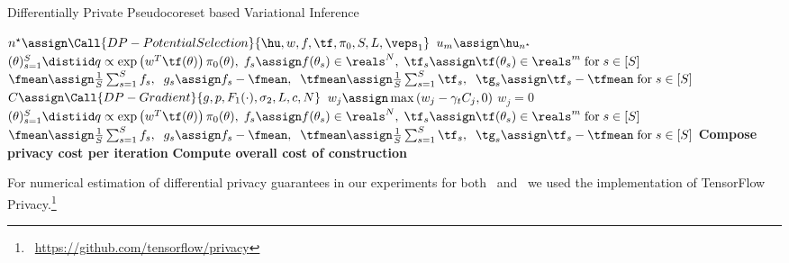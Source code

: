 \begin{algorithm*}[]
	\caption{Differentially Private Pseudocoreset based Variational Inference}
	\label{alg:dp-psvi}
	\begin{algorithmic}[1]
		\State $ n^\star \assign \Call{DP-PotentialSelection}{\hu, w, f, \tf, \pi_0, S, L, \veps_1}$
		\State $  u_m\assign \hu_{n^\star} $
		\State $ (\theta)_{s=1}^{S}  \distiid  q \propto  \exp\left(w^T\tf(\theta)\right)\pi_0(\theta),\; f_s \assign f(\theta_s)  \in \reals^{N}, \; \tf_s \assign \tf(\theta_s)  \in \reals^{m}\; \text{for} \; s\in [S] $ 
		\State $ {\fmean \assign \frac{1}{S} \sum_{s=1}^{S} f_s,\;\; g_s \assign f_s - \fmean, \;\; \tfmean \assign \frac{1}{S} \sum_{s=1}^{S} \tf_s,\;\; \tg_s \assign \tf_s - \tfmean \; \text{for} \;  s\in [S]} $
		\State $ C \assign \Call{DP-Gradient}{g, p, F_1(\cdot), \sigma_2, L, c, N} $  
{$w_j \assign \max\left(w_j - \gamma_t C_j, 0 \right)$}%
{$w_j=0$}  %
        \EndFor{}
		\State $ (\theta)_{s=1}^{S}  \distiid  q \propto \exp \left(w^T\tf(\theta)\right) \pi_0(\theta),\;  f_s \assign f(\theta_s)\in\reals^{N},\;\tf_s \assign \tf(\theta_s)\in\reals^{m} \;\text{for}\; s\in [S]$  
		\State $ \fmean \assign \frac{1}{S} \sum_{s=1}^{S}f_s,\;\; g_s \assign f_s - \fmean, \;\; \tfmean \assign \frac{1}{S} \sum_{s=1}^{S}\tf_s,\;\; \tg_s \assign \tf_s - \tfmean \;\text{for}\; s\in [S] $
		\EndFor
		\State \textbf{Compose privacy cost per iteration} 
		\EndFor
		\State \textbf{Compute overall cost of construction}
		\EndProcedure
	\end{algorithmic}
\end{algorithm*}
\fi

For numerical estimation of differential privacy guarantees in our experiments for both \dpsvi~and \dpvi~we used the implementation of TensorFlow Privacy.\footnote{~\href{https://github.com/tensorflow/privacy}{https://github.com/tensorflow/privacy}}